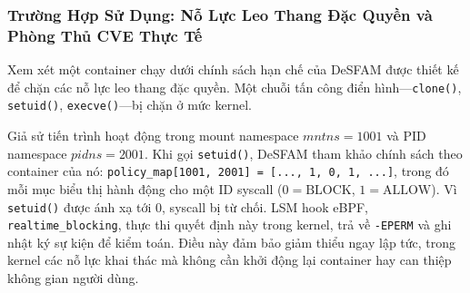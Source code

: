 \subsubsection{Trường Hợp Sử Dụng: Nỗ Lực Leo Thang Đặc Quyền và Phòng Thủ CVE Thực Tế}
\label{subsubsec:usecase}

Xem xét một container chạy dưới chính sách hạn chế của DeSFAM được thiết kế để chặn các nỗ lực
leo thang đặc quyền. Một chuỗi tấn công điển hình---\texttt{clone()}, \texttt{setuid()},
\texttt{execve()}---bị chặn ở mức kernel.

Giả sử tiến trình hoạt động trong mount namespace $\mathit{mntns} = 1001$ và PID namespace
$\mathit{pidns} = 2001$. Khi gọi \texttt{setuid()}, DeSFAM tham khảo chính sách theo container
của nó: \texttt{policy\_map[1001, 2001] = [..., 1, 0, 1, ...]}, trong đó mỗi mục biểu thị hành
động cho một ID syscall ($0 = \text{BLOCK}$, $1 = \text{ALLOW}$). Vì \texttt{setuid()} được ánh
xạ tới 0, syscall bị từ chối. LSM hook eBPF, \texttt{realtime\_blocking}, thực thi quyết định
này trong kernel, trả về \texttt{-EPERM} và ghi nhật ký sự kiện để kiểm toán. Điều này đảm bảo
giảm thiểu ngay lập tức, trong kernel các nỗ lực khai thác mà không cần khởi động lại container
hay can thiệp không gian người dùng.
